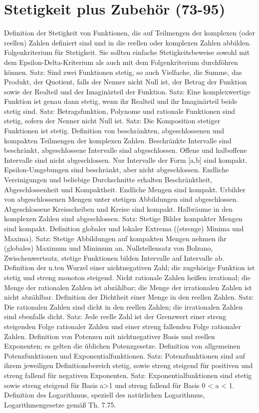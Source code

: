 \section{Stetigkeit plus Zubehör (73-95)}
 
Definition der Stetigkeit von Funktionen, die auf Teilmengen der komplexen (oder reellen) Zahlen definiert sind und in die reellen oder komplexen Zahlen abbilden. Folgenkriterium für Stetigkeit. Sie sollten einfache Stetigkeitsbeweise sowohl mit dem Epsilon-Delta-Kriterium als auch mit dem Folgenkriterium durchföhren können. Satz: Sind zwei Funktionen stetig, so auch Vielfache, die Summe, das Produkt, der Quotient, falls der Nenner nicht Null ist, der Betrag der Funktion sowie der Realteil und der Imaginärteil der Funktion. Satz: Eine komplexwertige Funktion ist genau dann stetig, wenn ihr Realteil und ihr Imaginärteil beide stetig sind. Satz: Betragsfunktion, Polynome und rationale Funktionen sind stetig, sofern der Nenner nicht Null ist. Satz: Die Komposition stetiger Funktionen ist stetig. Definition von beschränkten, abgeschlossenen und kompakten Teilmengen der komplexen Zahlen. Beschränkte Intervalle sind beschränkt, abgeschlossene Intervalle sind abgeschlossen. Offene und halboffene Intervalle sind nicht abgeschlossen. Nur Intervalle der Form [a,b] sind kompakt. Epsilon-Umgebungen sind beschränkt, aber nicht abgeschlossen. Endliche Vereinigungen und beliebige Durchschnitte erhalten Beschränktheit, Abgeschlossenheit und Kompaktheit. Endliche Mengen sind kompakt. Urbilder von abgeschlossenen Mengen unter stetigen Abbildungen sind abgeschlossen. Abgeschlossene Kreisscheiben und Kreise sind kompakt. Halbräume in den komplexen Zahlen sind abgeschlossen. Satz: Stetige Bilder kompakter Mengen sind kompakt. Definition globaler und lokaler Extrema ((strenge) Minima und Maxima). Satz: Stetige Abbildungen auf kompakten Mengen nehmen ihr (globales) Maximum und Minimum an. Nullstellensatz von Bolzano, Zwischenwertsatz, stetige Funktionen bilden Intervalle auf Intervalle ab. Definition der n.ten Wurzel einer nichtnegativen Zahl; die zugehörige Funktion ist stetig und streng monoton steigend. Nicht rationale Zahlen heißen irrational; die Menge der rationalen Zahlen ist abzählbar; die Menge der irrationalen Zahlen ist nicht abzählbar. Definition der Dichtheit einer Menge in den reellen Zahlen. Satz: Die rationalen Zahlen sind dicht in den reellen Zahlen; die irrationalen Zahlen sind ebenfalls dicht. Satz: Jede reelle Zahl ist der Grenzwert einer streng steigenden Folge rationaler Zahlen und einer streng fallenden Folge rationaler Zahlen. Definition von Potenzen mit nichtnegativer Basis und reellen Exponenten; es gelten die üblichen Potenzgesetze. Definition von allgemeinen Potenzfunktionen und Exponentialfunktionen. Satz: Potenzfunktionen sind auf ihrem jeweiligen Definitionsbereich stetig, sowie streng steigend für positiven und streng fallend für negativen Exponenten. Satz: Exponentialfunktionen sind stetig sowie streng steigend für Basis a>1 und streng fallend für Basis 0 < a < 1. Definition des Logarithmus, speziell des natürlichen Logarithmus, Logarithmengesetze gemäß Th. 7.75. 


